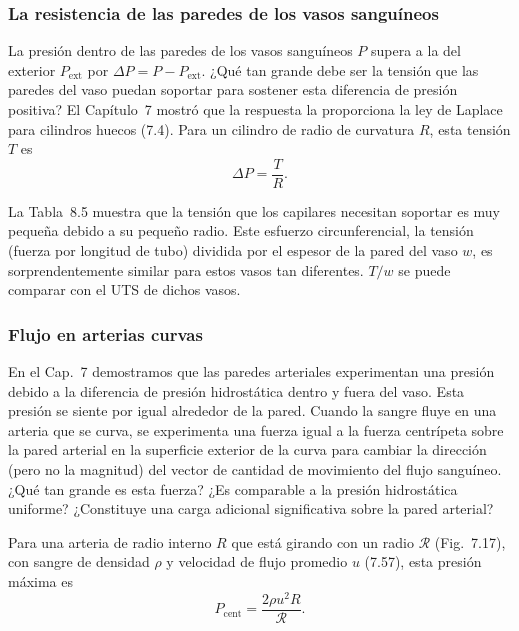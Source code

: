 \documentclass[12pt]{book}
\begin{document}
\subsubsection*{La resistencia de las paredes de los vasos sanguíneos}

La presión dentro de las paredes de los vasos sanguíneos $P$ supera a la del exterior $P_{\text{ext}}$ por $\Delta P = P - P_{\text{ext}}$. ¿Qué tan grande debe ser la tensión que las paredes del vaso puedan soportar para sostener esta diferencia de presión positiva? El Capítulo~7 mostró que la respuesta la proporciona la ley de Laplace para cilindros huecos (7.4). Para un cilindro de radio de curvatura $R$, esta tensión $T$ es
\begin{equation}
\Delta P = \frac{T}{R}.
\label{eq:825}
\end{equation}

La Tabla~8.5 muestra que la tensión que los capilares necesitan soportar es muy pequeña debido a su pequeño radio. Este esfuerzo circunferencial, la tensión (fuerza por longitud de tubo) dividida por el espesor de la pared del vaso $w$, es sorprendentemente similar para estos vasos tan diferentes. $T/w$ se puede comparar con el UTS de dichos vasos.

\subsubsection*{Flujo en arterias curvas}

En el Cap.~7 demostramos que las paredes arteriales experimentan una presión debido a la diferencia de presión hidrostática dentro y fuera del vaso. Esta presión se siente por igual alrededor de la pared. Cuando la sangre fluye en una arteria que se curva, se experimenta una fuerza igual a la fuerza centrípeta sobre la pared arterial en la superficie exterior de la curva para cambiar la dirección (pero no la magnitud) del vector de cantidad de movimiento del flujo sanguíneo. ¿Qué tan grande es esta fuerza? ¿Es comparable a la presión hidrostática uniforme? ¿Constituye una carga adicional significativa sobre la pared arterial?

Para una arteria de radio interno $R$ que está girando con un radio $\mathcal{R}$ (Fig.~7.17), con sangre de densidad $\rho$ y velocidad de flujo promedio $u$ (7.57), esta presión máxima es
\begin{equation}
P_{\text{cent}} = \frac{2\rho u^2 R}{\mathcal{R}}.
\label{eq:826}
\end{equation}
\end{document}
